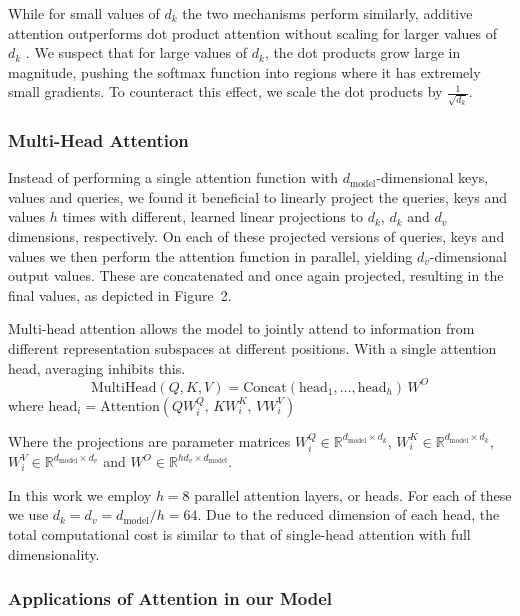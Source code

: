 While for small values of $d_k$ the two mechanisms perform similarly, additive
attention outperforms dot product attention without scaling for larger values of
$d_k$ \cite{DBLP:journals/corr/BritzGLL17}. We suspect that for large values
of $d_k$, the dot products grow large in magnitude, pushing the softmax function
into regions where it has extremely small gradients. To counteract this effect,
we scale the dot products by $\frac{1}{\sqrt{d_k}}$.

\subsubsection{Multi-Head Attention}

Instead of performing a single attention function with $d_{\text{model}}$-dimensional
keys, values and queries, we found it beneficial to linearly project the queries,
keys and values $h$ times with different, learned linear projections to $d_k$,
$d_k$ and $d_v$ dimensions, respectively. On each of these projected versions of
queries, keys and values we then perform the attention function in parallel,
yielding $d_v$-dimensional output values. These are concatenated and once again
projected, resulting in the final values, as depicted in Figure~2.

Multi-head attention allows the model to jointly attend to information from
different representation subspaces at different positions. With a single
attention head, averaging inhibits this.
\[
  \mathrm{MultiHead}(Q, K, V) = \mathrm{Concat}(\mathrm{head}_1, \ldots, \mathrm{head}_h)\,W^O
\]
where $\mathrm{head}_i = \mathrm{Attention}(QW_i^Q,\, KW_i^K,\, VW_i^V)$

Where the projections are parameter matrices
$W_i^Q \in \mathbb{R}^{d_{\text{model}} \times d_k}$,
$W_i^K \in \mathbb{R}^{d_{\text{model}} \times d_k}$,
$W_i^V \in \mathbb{R}^{d_{\text{model}} \times d_v}$ and
$W^O \in \mathbb{R}^{hd_v \times d_{\text{model}}}$.

In this work we employ $h = 8$ parallel attention layers, or heads. For each
of these we use $d_k = d_v = d_{\text{model}}/h = 64$. Due to the reduced
dimension of each head, the total computational cost is similar to that of
single-head attention with full dimensionality.

\subsubsection{Applications of Attention in our Model}

